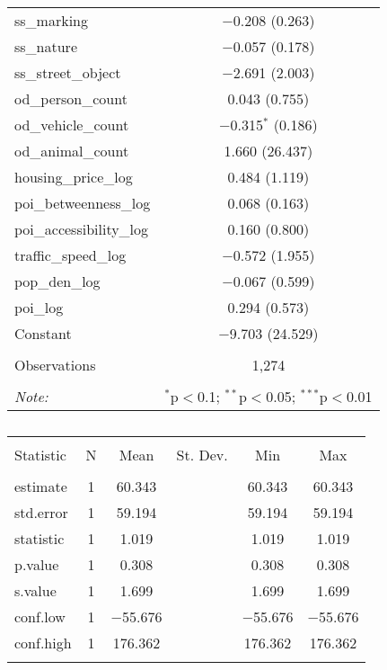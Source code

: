 \begin{table}[!htbp]
\begin{tabular}{@{\extracolsep{1pt}}lc}
  ss\_marking & $-$0.208 (0.263) \\ 
  ss\_nature & $-$0.057 (0.178) \\ 
  ss\_street\_object & $-$2.691 (2.003) \\ 
  od\_person\_count & 0.043 (0.755) \\ 
  od\_vehicle\_count & $-$0.315$^{*}$ (0.186) \\ 
  od\_animal\_count & 1.660 (26.437) \\ 
  housing\_price\_log & 0.484 (1.119) \\ 
  poi\_betweenness\_log & 0.068 (0.163) \\ 
  poi\_accessibility\_log & 0.160 (0.800) \\ 
  traffic\_speed\_log & $-$0.572 (1.955) \\ 
  pop\_den\_log & $-$0.067 (0.599) \\ 
  poi\_log & 0.294 (0.573) \\ 
  Constant & $-$9.703 (24.529) \\ 
 \hline \\[-1.8ex] 
Observations & 1,274 \\ 
\hline 
\hline \\[-1.8ex] 
\textit{Note:}  & \multicolumn{1}{r}{$^{*}$p$<$0.1; $^{**}$p$<$0.05; $^{***}$p$<$0.01} \\ 
\end{tabular} 
\end{table} 

\begin{table}[!htbp] \centering 
  \caption{} 
  \label{} 
\small 
\begin{tabular}{@{\extracolsep{1pt}}lccccc} 
\\[-1.8ex]\hline 
\hline \\[-1.8ex] 
Statistic & \multicolumn{1}{c}{N} & \multicolumn{1}{c}{Mean} & \multicolumn{1}{c}{St. Dev.} & \multicolumn{1}{c}{Min} & \multicolumn{1}{c}{Max} \\ 
\hline \\[-1.8ex] 
estimate & 1 & 60.343 &  & 60.343 & 60.343 \\ 
std.error & 1 & 59.194 &  & 59.194 & 59.194 \\ 
statistic & 1 & 1.019 &  & 1.019 & 1.019 \\ 
p.value & 1 & 0.308 &  & 0.308 & 0.308 \\ 
s.value & 1 & 1.699 &  & 1.699 & 1.699 \\ 
conf.low & 1 & $-$55.676 &  & $-$55.676 & $-$55.676 \\ 
conf.high & 1 & 176.362 &  & 176.362 & 176.362 \\ 
\hline \\[-1.8ex] 
\end{tabular} 
\end{table} 

